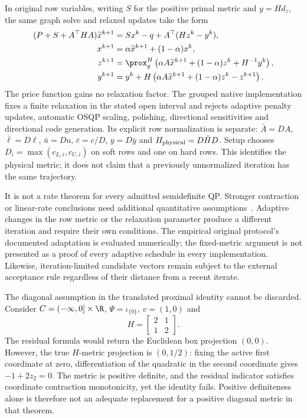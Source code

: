 In original row variables, writing $S$ for the positive primal metric
and $y=Hd_z$, the same graph solve and relaxed updates take the form
\begin{align}\label{eq:paper-native-updates}
 (P+S+A^\top HA)\widetilde x^{k+1}
   &=Sx^k-q+A^\top(Hz^k-y^k),\\
 x^{k+1}&=\alpha\widetilde x^{k+1}+(1-\alpha)x^k,\nonumber\\
 z^{k+1}&=\prox_g^H\left(\alpha A\widetilde x^{k+1}
                       +(1-\alpha)z^k+H^{-1}y^k\right),\nonumber\\
 y^{k+1}&=y^k+H\left(\alpha A\widetilde x^{k+1}
                       +(1-\alpha)z^k-z^{k+1}\right).\nonumber
\end{align}
The price function gains no relaxation factor. The grouped native
implementation fixes a finite relaxation in the stated open interval
and rejects adaptive penalty updates, automatic OSQP scaling, polishing,
directional sensitivities and directional code generation. Its explicit
row normalization is separate: $\bar A=DA$, $\bar\ell=D\ell$,
$\bar u=Du$, $\bar c=c/D$, $y=D\bar y$ and
$H_{\rm physical}=D\bar H D$. Setup chooses
$D_i=\max(c_{L,i},c_{U,i})$ on soft rows and one on hard rows.
This identifies the physical metric; it does not claim that a
previously unnormalized iteration has the same trajectory.

It is not a rate theorem for every admitted semidefinite QP. Stronger
contraction or linear-rate conclusions need additional quantitative
assumptions~\cite{giselsson}. Adaptive changes in the row metric or the
relaxation parameter produce a different iteration and require their
own conditions. The empirical original protocol's documented adaptation
is evaluated numerically; the fixed-metric argument is not presented
as a proof of every adaptive schedule in every implementation. Likewise,
iteration-limited candidate vectors remain subject to the external
acceptance rule regardless of their distance from a recent iterate.

The diagonal assumption in the translated proximal identity cannot be
discarded. Consider $C=(-\infty,0]\times\R$, $\Psi=\iota_{\{0\}}$,
$v=(1,0)$ and
\begin{equation}\label{eq:paper-dense-counterexample}
 H=\begin{bmatrix}2&1\\1&2\end{bmatrix}.
\end{equation}
The residual formula would return the Euclidean box projection $(0,0)$.
However, the true $H$-metric projection is $(0,1/2)$: fixing the active
first coordinate at zero, differentiation of the quadratic in the
second coordinate gives $-1+2z_2=0$. The metric is positive definite,
and the residual indicator satisfies coordinate contraction monotonicity,
yet the identity fails. Positive definiteness alone is therefore not
an adequate replacement for a positive diagonal metric in that theorem.

